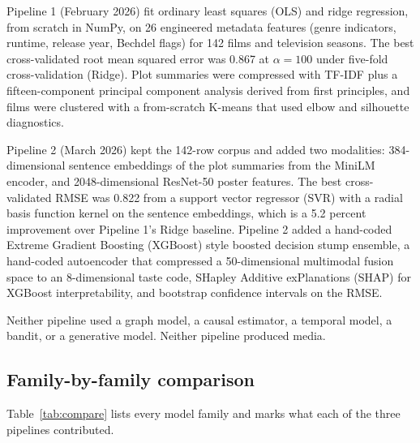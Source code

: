 \documentclass{article}
\begin{document}
Pipeline 1 (February 2026) fit ordinary least squares (OLS) and ridge regression, from scratch in NumPy, on 26 engineered metadata features (genre indicators, runtime, release year, Bechdel flags) for 142 films and television seasons. The best cross-validated root mean squared error was 0.867 at $\alpha = 100$ under five-fold cross-validation (Ridge). Plot summaries were compressed with TF-IDF plus a fifteen-component principal component analysis derived from first principles, and films were clustered with a from-scratch K-means that used elbow and silhouette diagnostics.

Pipeline 2 (March 2026) kept the 142-row corpus and added two modalities: 384-dimensional sentence embeddings of the plot summaries from the MiniLM encoder, and 2048-dimensional ResNet-50 poster features. The best cross-validated RMSE was 0.822 from a support vector regressor (SVR) with a radial basis function kernel on the sentence embeddings, which is a 5.2 percent improvement over Pipeline 1's Ridge baseline. Pipeline 2 added a hand-coded Extreme Gradient Boosting (XGBoost) style boosted decision stump ensemble, a hand-coded autoencoder that compressed a 50-dimensional multimodal fusion space to an 8-dimensional taste code, SHapley Additive exPlanations (SHAP) for XGBoost interpretability, and bootstrap confidence intervals on the RMSE.

Neither pipeline used a graph model, a causal estimator, a temporal model, a bandit, or a generative model. Neither pipeline produced media.

\subsection{Family-by-family comparison}

Table~\ref{tab:compare} lists every model family and marks what each of the three pipelines contributed.
\end{document}
